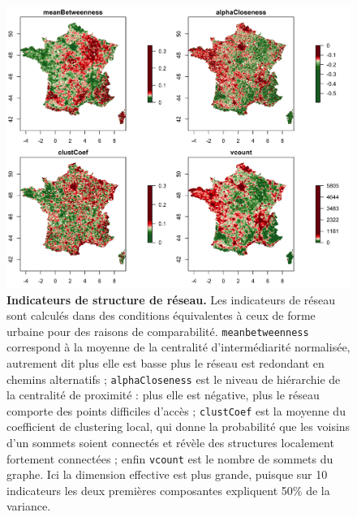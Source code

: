 \begin{figure}%
\centering
\includegraphics[width=\textwidth]{figures/morpho_indics_network_selected_2_discrquantiles}
\caption{\textbf{Indicateurs de structure de réseau.} Les indicateurs de réseau sont calculés dans des conditions équivalentes à ceux de forme urbaine pour des raisons de comparabilité. \texttt{meanbetweenness} correspond à la moyenne de la centralité d'intermédiarité normalisée, autrement dit plus elle est basse plus le réseau est redondant en chemins alternatifs ; \texttt{alphaCloseness} est le niveau de hiérarchie de la centralité de proximité : plus elle est négative, plus le réseau comporte des points difficiles d'accès ; \texttt{clustCoef} est la moyenne du coefficient de clustering local, qui donne la probabilité que les voisins d'un sommets soient connectés et révèle des structures localement fortement connectées ; enfin \texttt{vcount} est le nombre de sommets du graphe. Ici la dimension effective est plus grande, puisque sur 10 indicateurs les deux premières composantes expliquent 50\% de la variance.}
\label{fig:indics-nw}
\end{figure}


